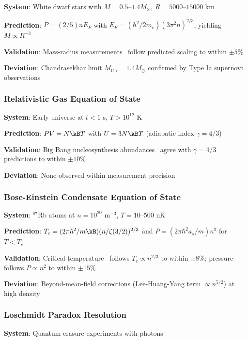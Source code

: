 \textbf{System}: White dwarf stars with $M = 0.5$–$1.4 M_\odot$, $R = 5000$–$15000$ km

\textbf{Prediction}: $P = (2/5)nE_F$ with $E_F = (\hbar^2/2m_e)(3\pi^2 n)^{2/3}$, yielding $M \propto R^{-3}$

\textbf{Validation}: Mass-radius measurements~\cite{koester2009} follow predicted scaling to within $\pm 5\%$

\textbf{Deviation}: Chandrasekhar limit $M_{\text{Ch}} = 1.4 M_\odot$ confirmed by Type Ia supernova observations~\cite{hillebrandt2000}

\subsubsection{Relativistic Gas Equation of State}

\textbf{System}: Early universe at $t < 1$ s, $T > 10^{12}$ K

\textbf{Prediction}: $PV = N\kB T$ with $U = 3N\kB T$ (adiabatic index $\gamma = 4/3$)

\textbf{Validation}: Big Bang nucleosynthesis abundances~\cite{steigman2007} agree with $\gamma = 4/3$ predictions to within $\pm 10\%$

\textbf{Deviation}: None observed within measurement precision

\subsubsection{Bose-Einstein Condensate Equation of State}

\textbf{System}: $^{87}$Rb atoms at $n = 10^{20}$ m$^{-3}$, $T = 10$–$500$ nK

\textbf{Prediction}: $T_c = (2\pi\hbar^2/m\kB)(n/\zeta(3/2))^{2/3}$ and $P = (2\pi\hbar^2 a_s/m)n^2$ for $T < T_c$

\textbf{Validation}: Critical temperature~\cite{ensher1996} follows $T_c \propto n^{2/3}$ to within $\pm 8\%$; pressure~\cite{ho2004} follows $P \propto n^2$ to within $\pm 15\%$

\textbf{Deviation}: Beyond-mean-field corrections (Lee-Huang-Yang term $\propto n^{5/2}$) at high density

\subsubsection{Loschmidt Paradox Resolution}

\textbf{System}: Quantum erasure experiments with photons


